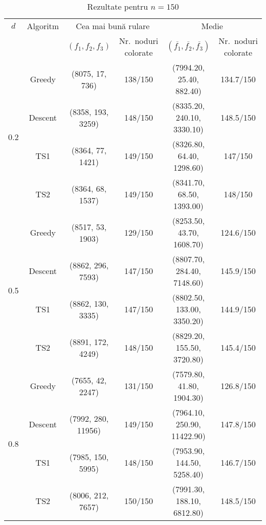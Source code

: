 \begin{table}[H]
\centering
\caption{Rezultate pentru $n = 150$}
\scriptsize
\begin{tabular}{cc  cc  cc}
\toprule
$d$ & Algoritm 
    & \multicolumn{2}{c}{Cea mai bună rulare} 
    & \multicolumn{2}{c}{Medie} \\
\cmidrule(r){3-4} \cmidrule(l){5-6}
& 
& $(f_1, f_2, f_3)$ & Nr.\ noduri colorate 
& $(\overline{f_1}, \overline{f_2}, \overline{f_3})$ & Nr.\ noduri colorate \\
\midrule
\multirow{4}{*}{0.2}
  & Greedy  & (8075, 17, 736)    & 138/150 & (7994.20, 25.40, 882.40)   & 134.7/150 \\
  & Descent & (8358, 193, 3259)  & 148/150 & (8335.20, 240.10, 3330.10) & 148.5/150 \\
  & TS1     & (8364, 77, 1421)   & 149/150 & (8326.80, 64.40, 1298.60)  & 147/150 \\
  & TS2     & (8364, 68, 1537)   & 149/150 & (8341.70, 68.50, 1393.00)  & 148/150 \\
\midrule
\multirow{4}{*}{0.5}
  & Greedy  & (8517, 53, 1903)   & 129/150 & (8253.50, 43.70, 1608.70)  & 124.6/150 \\
  & Descent & (8862, 296, 7593)  & 147/150 & (8807.70, 284.40, 7148.60) & 145.9/150 \\
  & TS1     & (8862, 130, 3335)  & 147/150 & (8802.50, 133.00, 3350.20) & 144.9/150 \\
  & TS2     & (8891, 172, 4249)  & 148/150 & (8829.20, 155.50, 3720.80) & 145.4/150 \\
\midrule
\multirow{4}{*}{0.8}
  & Greedy  & (7655, 42, 2247)   & 131/150 & (7579.80, 41.80, 1904.30)  & 126.8/150 \\
  & Descent & (7992, 280, 11956) & 149/150 & (7964.10, 250.90, 11422.90)& 147.8/150 \\
  & TS1     & (7985, 150, 5995)  & 148/150 & (7953.90, 144.50, 5258.40) & 146.7/150 \\
  & TS2     & (8006, 212, 7657)  & 150/150 & (7991.30, 188.10, 6812.80) & 148.5/150 \\
\bottomrule
\end{tabular}\label{tab:rezultate_n150}
\end{table}


